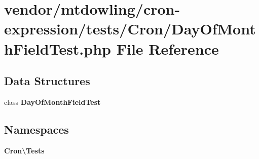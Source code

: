 \section{vendor/mtdowling/cron-\/expression/tests/\+Cron/\+Day\+Of\+Month\+Field\+Test.php File Reference}
\label{_day_of_month_field_test_8php}
\subsection*{Data Structures}
\begin{DoxyCompactItemize}
\item 
class {\bf Day\+Of\+Month\+Field\+Test}
\end{DoxyCompactItemize}
\subsection*{Namespaces}
\begin{DoxyCompactItemize}
\item 
 {\bf Cron\textbackslash{}\+Tests}
\end{DoxyCompactItemize}
